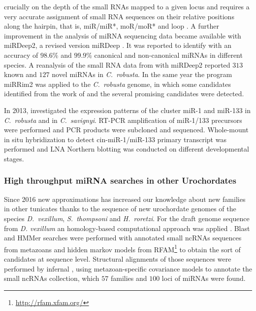 \documentclass[graybox]{svmult}
\begin{document}
crucially on the depth of the small RNAs mapped to a given locus and
requires a very accurate assignment of small RNA sequences on their
relative positions along the hairpin, that is, miR/miR*, moR/moR* and loop
\cite{Hendrix2010}. A further improvement in the analysis of miRNA
sequencing data became available with miRDeep2, a revised version miRDeep
\cite{Friedlaender:12}.  It was reported to identify with an accuracy of
$98.6$\% and $99.9$\% canonical and non-canonical miRNAs in different
species. A reanalysis of the small RNA data from \cite{Shi2009} with
miRDeep2 reported $313$ known and $127$ novel miRNAs in \textit{C.\
  robusta}. In the same year the program miRRim2 \cite{Terai2012} was
applied to the \textit{C.\ robusta} genome, in which some candidates
identified from the work of \cite{Hendrix2010} and the several promising
candidates were detected.

In 2013, \cite{Kusakabe2013} investigated the expression patterns of the
cluster miR-1 and miR-133 in \textit{C.\ robusta} and in \textit{C.\
  savignyi}. RT-PCR amplification of miR-1/133 precursors were performed
and PCR products were subcloned and sequenced. Whole-mount in situ
hybridization to detect cin-miR-1/miR-133 primary transcript was performed
and LNA Northern blotting was conducted on different developmental stages.

\subsubsection{High throughput miRNA searches in other Urochordates}

Since 2016 new approximations has increased our knowledge about new
families in other tunicates thanks to the sequence of new urochordate
genomes of the species \textit{D.\ vexillum}, \textit{S.\ thompsoni} and
\textit{H.\ roretzi}. For the draft genome sequence from
\textit{D. vexillum} an homology-based computational approach was applied
\cite{Velandia-Huerto2016}.  Blast and HMMer searches were performed with
annotated small ncRNAs sequences from metazoans and hidden markov models
from RFAM\footnote{\url{http://rfam.xfam.org/}} to obtain the sort of
candidates at sequence level. Structural alignments of those sequences were
performed by infernal \cite{Nawrocki:201}, using metazoan-specific
covariance models to annotate the small ncRNAs collection, which $57$
families and $100$ loci of miRNAs were found.
\end{document}
